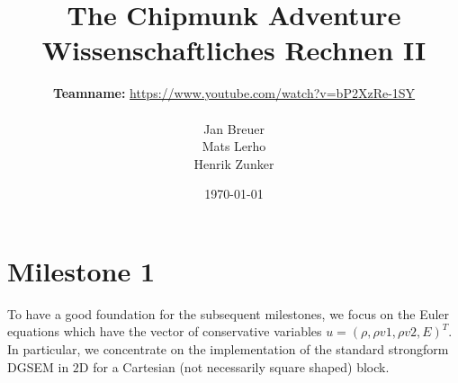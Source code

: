 \documentclass[11pt]{scrartcl}
\begin{document}


\title{{\Huge The Chipmunk Adventure} \\[18pt]
Wissenschaftliches Rechnen II \\[18pt]}
\author{\textbf{Teamname:} \href{https://www.youtube.com/watch?v=bP2XzRe-1SY}{https://www.youtube.com/watch?v=bP2XzRe-1SY} \\ \ \\
Jan Breuer\\
Mats Lerho \\
Henrik Zunker}
\date{\today}

\maketitle



\thispagestyle{empty} %


% 

\newpage
\tableofcontents
\thispagestyle{empty}
\newpage

\section{Milestone 1}
To have a good foundation for the subsequent milestones, we focus on the Euler equations which have the vector of conservative variables $u=(\rho, \rho v1, \rho v2, E)^T$. In particular, we concentrate on the implementation of the standard strongform DGSEM in $2$D for a Cartesian (not necessarily square shaped) block. \\
\end{document}
